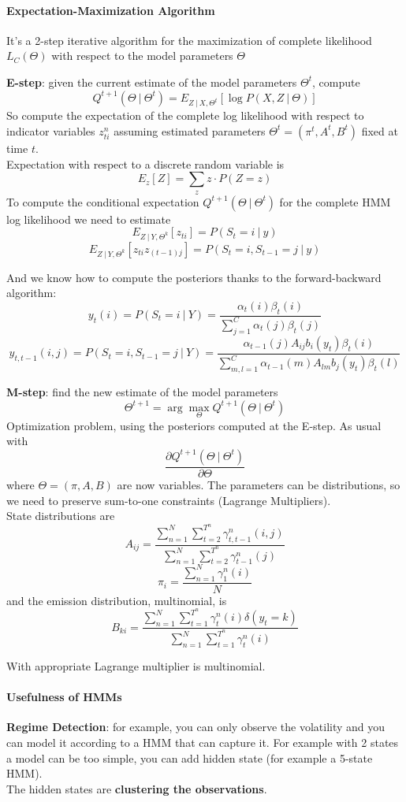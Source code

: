 \documentclass[10pt]{report}
\begin{document}
\paragraph{Expectation-Maximization Algorithm} It's a 2-step iterative algorithm for the maximization of complete likelihood $L_C(\Theta)$ with respect to the model parameters $\Theta$\begin{list}{}{}
	\item \textbf{E-step}: given the current estimate of the model parameters $\Theta^t$, compute $$Q^{t+1}(\Theta\:|\:\Theta^t) = E_{Z\:|\:X,\Theta^t}[\log P(X,Z\:|\:\Theta)]$$
	So compute the expectation of the complete log likelihood with respect to indicator variables $z_{ti}^n$ assuming estimated parameters $\Theta^t = (\pi^t, A^t, B^t)$ fixed at time $t$.\\
	Expectation with respect to a discrete random variable is $$E_z[Z] = \sum_z z\cdot P(Z=z)$$
	To compute the conditional expectation $Q^{t+1}(\Theta\:|\:\Theta^t)$ for the complete HMM log likelihood we need to estimate $$E_{Z\:|\:Y,\Theta^k}[z_{ti}] = P(S_t=i\:|\:y)$$
	$$E_{Z\:|\:Y,\Theta^k}[z_{ti}z_{(t-1)j}] = P(S_t = i, S_{t-1}=j\:|\:y)$$
	
	And we know how to compute the posteriors thanks to the forward-backward algorithm:
	$$y_t(i) = P(S_t = i\:|\:Y) = \frac{\alpha_t(i)\beta_t(i)}{\sum_{j=1}^C\alpha_t(j)\beta_t(j)}$$
	$$y_{t,t-1}(i,j) = P(S_t = i, S_{t-1} = j\:|\:Y) = \frac{\alpha_{t-1}(j)A_{ij}b_i(y_t)\beta_t(i)}{\sum_{m,l=1}^C \alpha_{t-1}(m)A_{lm}b_j(y_t)\beta_t(l)}$$
	\item \textbf{M-step}: find the new estimate of the model parameters $$\Theta^{t+1} = \arg\max_\Theta Q^{t+1}(\Theta\:|\:\Theta^t)$$
	Optimization problem, using the posteriors computed at the E-step. As usual with $$\frac{\partial Q^{t+1}(\Theta\:|\:\Theta^t)}{\partial\Theta}$$
	where $\Theta = (\pi, A, B)$ are now variables. The parameters can be distributions, so we need to preserve sum-to-one constraints (Lagrange Multipliers).\\
	State distributions are
	$$A_{ij}=\frac{\sum_{n=1}^N\sum_{t=2}^{T^n} \gamma_{t,t-1}^n(i,j)}{\sum_{n=1}^N\sum_{t=2}^{T^n}\gamma_{t-1}^n(j)}$$
	$$\pi_i=\frac{\sum_{n=1}^N\gamma_1^n(i)}{N}$$
	and the emission distribution, multinomial, is
	$$B_{ki} = \frac{\sum_{n=1}^N\sum_{t=1}^{T^n}\gamma_t^n(i)\delta(y_t=k)}{\sum_{n=1}^N\sum_{t=1}^{T^n}\gamma_t^n(i)}$$
\end{list}
With appropriate Lagrange multiplier is multinomial.
\paragraph{Usefulness of HMMs}\begin{list}{}{}
	\item \textbf{Regime Detection}: for example, you can only observe the volatility and you can model it according to a HMM that can capture it. For example with 2 states a model can be too simple, you can add hidden state (for example a 5-state HMM).\\
	The hidden states are \textbf{clustering the observations}.
\end{list}
\end{document}
